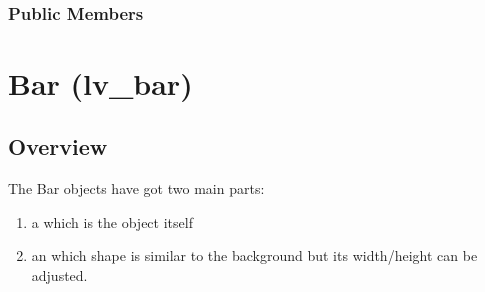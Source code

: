 \documentclass[letterpaper,10pt,english]{sphinxmanual}
\begin{document}
\begin{fulllineitems}
\label{\detokenize{object-types/arc:_CPPv412lv_arc_ext_t}}%
\pysigstartmultiline
{}\label{\detokenize{object-types/arc:structlv__arc__ext__t}}%
\pysigstopmultiline~\subsubsection*{Public Members}

\begin{fulllineitems}
\label{\detokenize{object-types/arc:_CPPv4N12lv_arc_ext_t11angle_startE}}%
\pysigstartmultiline
{}%
\pysigstopmultiline
\end{fulllineitems}


\begin{fulllineitems}
\label{\detokenize{object-types/arc:_CPPv4N12lv_arc_ext_t9angle_endE}}%
\pysigstartmultiline
{}%
\pysigstopmultiline
\end{fulllineitems}


\end{fulllineitems}



\section{Bar (lv\_bar)}
\label{\detokenize{object-types/bar:bar-lv-bar}}\label{\detokenize{object-types/bar::doc}}

\subsection{Overview}
\label{\detokenize{object-types/bar:overview}}
The Bar objects have got two main parts:
\begin{enumerate}
\def\theenumi{\arabic{enumi}}
\def\labelenumi{\theenumi .}
\makeatletter\def\p@enumii{\p@enumi \theenumi .}\makeatother
\item {} 
a  which is the object itself

\item {} 
an  which shape is similar to the background but its width/height can be adjusted.

\end{enumerate}
\end{document}
